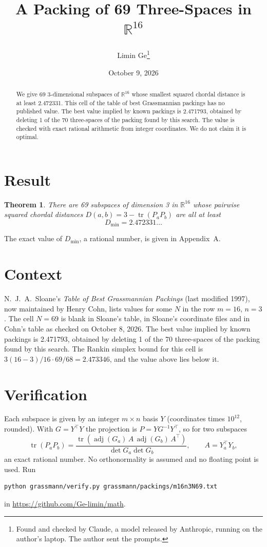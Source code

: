 \documentclass[11pt,a4paper]{article}
\title{A Packing of 69 Three-Spaces in $\mathbb{R}^{16}$}
\author{Limin Ge\thanks{Found and checked by Claude, a model released by Anthropic, running on the author's laptop. The author sent the prompts.}}
\date{October 9, 2026}
\newtheorem*{theorem}{Theorem}
\begin{document}
\maketitle
\begin{abstract}
We give 69 3-dimensional subspaces of $\mathbb{R}^{16}$ whose smallest squared chordal distance is at least 2.472331. This cell of the table of best Grassmannian packings has no published value. The best value implied by known packings is 2.471793, obtained by deleting 1 of the 70 three-spaces of the packing found by this search. The value is checked with exact rational arithmetic from integer coordinates. We do not claim it is optimal.
\end{abstract}

\section{Result}
\begin{theorem}
There are 69 subspaces of dimension 3 in $\mathbb{R}^{16}$ whose pairwise squared chordal distances $D(a,b) = 3 - \operatorname{tr}(P_aP_b)$ are all at least
\[ D_{\min} = 2.472331\ldots \]
\end{theorem}
The exact value of $D_{\min}$, a rational number, is given in Appendix~A.


\section{Context}
N.~J.~A.~Sloane's \emph{Table of Best Grassmannian Packings} (last modified 1997), now maintained by Henry Cohn, lists values for some $N$ in the row $m=16$, $n=3$. The cell $N=69$ is blank in Sloane's table, in Sloane's coordinate files and in Cohn's table as checked on October 8, 2026. The best value implied by known packings is 2.471793, obtained by deleting 1 of the 70 three-spaces of the packing found by this search. The Rankin simplex bound for this cell is $3(16-3)/16\cdot 69/68 = 2.473346$, and the value above lies below it.


\section{Verification}
Each subspace is given by an integer $m\times n$ basis $Y$ (coordinates times $10^{12}$, rounded). With $G=Y^\top Y$ the projection is $P=YG^{-1}Y^\top$, so for two subspaces
\[ \operatorname{tr}(P_aP_b)=\frac{\operatorname{tr}(\operatorname{adj}(G_a)\,A\,\operatorname{adj}(G_b)\,A^\top)}{\det G_a\det G_b},\qquad A=Y_a^\top Y_b, \]
an exact rational number. No orthonormality is assumed and no floating point is used. Run
\begin{verbatim}
python grassmann/verify.py grassmann/packings/m16n3N69.txt
\end{verbatim}
in \url{https://github.com/Ge-limin/math}.
\end{document}
